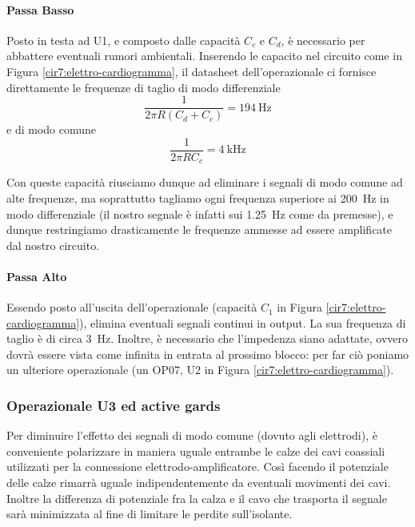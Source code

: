\paragraph*{Passa Basso}
Posto in testa ad U1, e composto dalle capacità $C_c$ e $C_d$, è necessario per abbattere eventuali rumori ambientali. Inserendo le capacito nel circuito come in Figura \ref{cir7:elettro-cardiogramma}, il datasheet dell'operazionale ci fornisce direttamente le frequenze di taglio di modo differenziale
\begin{equation*}
	\frac{1}{2 \pi R ( C_d + C_c ) } = \SI{194}{\Hz}
\end{equation*}
e di modo comune
\begin{equation*}
	\frac{1}{2 \pi R C_c} = \SI{4}{\kHz}
\end{equation*}

Con queste capacità riusciamo dunque ad eliminare i segnali di modo comune ad alte frequenze, ma soprattutto tagliamo ogni frequenza superiore ai \SI{200}{\Hz} in modo differenziale (il nostro segnale è infatti sui \SI{1.25}{\Hz} come da premesse), e dunque restringiamo drasticamente le frequenze ammesse ad essere amplificate dal nostro circuito.

\paragraph*{Passa Alto}
Essendo posto all'uscita dell'operazionale (capacità $C_1$ in Figura \ref{cir7:elettro-cardiogramma}), elimina eventuali segnali continui in output. La sua frequenza di taglio è di circa \SI{3}{\Hz}. Inoltre, è necessario che l'impedenza siano adattate, ovvero dovrà essere vista come infinita in entrata al prossimo blocco: per far ciò poniamo un ulteriore operazionale (un OP07, U2 in Figura \ref{cir7:elettro-cardiogramma}).

\subsubsection*{Operazionale U3 ed active gards}

Per diminuire l'effetto dei segnali di modo comune (dovuto agli elettrodi), è conveniente polarizzare in maniera uguale entrambe le calze dei cavi coassiali utilizzati per la connessione elettrodo-amplificatore. Così facendo il potenziale delle calze rimarrà uguale indipendentemente da eventuali movimenti dei cavi. Inoltre la differenza di potenziale fra la calza e il cavo che trasporta il segnale sarà minimizzata al fine di limitare le perdite sull'isolante.

